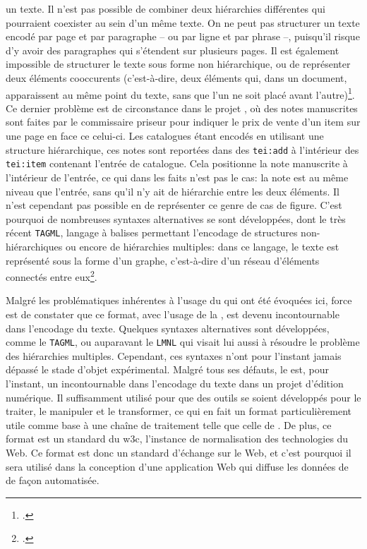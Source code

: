 un texte. Il n'est pas possible de combiner deux hiérarchies différentes qui pourraient coexister au sein d'un même texte. On ne peut pas structurer un texte encodé par page et par paragraphe -- ou par ligne et par phrase --, puisqu'il risque d'y avoir des paragraphes qui s'étendent sur plusieurs pages. Il est également impossible de structurer le texte sous forme non hiérarchique, ou de représenter deux éléments cooccurents (c'est-à-dire, deux éléments qui, dans un document, apparaissent au même point du texte, sans que l'un ne soit placé avant l'autre)\footcite{bleeker_texts_2021}. Ce dernier problème est de circonstance dans le projet \mssktb{}, où des notes manuscrites sont faites par le commissaire priseur pour indiquer le prix de vente d'un item sur une page en face ce celui-ci. Les catalogues étant encodés en utilisant une structure hiérarchique, ces notes sont reportées dans des \texttt{tei:add} à l'intérieur des \texttt{tei:item} contenant l'entrée de catalogue. Cela positionne la note manuscrite à l'intérieur de l'entrée, ce qui dans les faits n'est pas le cas: la note est au même niveau que l'entrée, sans qu'il n'y ait de hiérarchie entre les deux éléments. Il n'est cependant pas possible en \xml{} de représenter ce genre de cas de figure. C'est pourquoi de nombreuses syntaxes alternatives se sont développées, dont le très récent \texttt{TAGML}, langage à balises permettant l'encodage de structures non-hiérarchiques ou encore de hiérarchies multiples: dans ce langage, le texte est représenté sous la forme d'un graphe, c'est-à-dire d'un réseau d'éléments connectés entre eux\footcite{bleeker_texts_2021}.

Malgré les problématiques inhérentes à l'usage du \xml{} qui ont été évoquées ici, force est de constater que ce format, avec l'usage de la \tei{}, est devenu incontournable dans l'encodage du texte. Quelques syntaxes alternatives sont développées, comme le \texttt{TAGML}, ou auparavant le \texttt{LMNL} qui visait lui aussi à résoudre le problème des hiérarchies multiples. Cependant, ces syntaxes n'ont pour l'instant jamais dépassé le stade d'objet expérimental. Malgré tous ses défauts, le \xml{} est, pour l'instant, un incontournable dans l'encodage du texte dans un projet d'édition numérique. Il suffisamment utilisé pour que des outils se soient développés pour le traiter, le manipuler et le transformer, ce qui en fait un format particulièrement utile comme base à une chaîne de traitement telle que celle de \mssktb{}. De plus, ce format est un standard du \gls{w3c}, l'instance de normalisation des technologies du Web. Ce format est donc un standard d'échange sur le Web, et c'est pourquoi il sera utilisé dans la conception d'une application Web qui diffuse les données de \mssktb{} de façon automatisée. 

